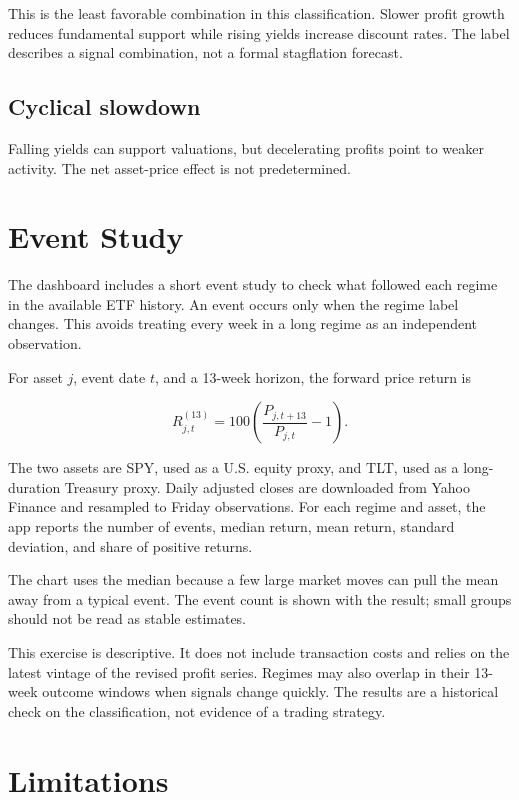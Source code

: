 \documentclass[11pt]{article}
\begin{document}
This is the least favorable combination in this classification. Slower profit growth
reduces fundamental support while rising yields increase discount rates. The
label describes a signal combination, not a formal stagflation forecast.

\subsection{Cyclical slowdown}

Falling yields can support valuations, but decelerating profits point to weaker
activity. The net asset-price effect is not predetermined.

\section{Event Study}

The dashboard includes a short event study to check what followed each regime
in the available ETF history. An event occurs only when the regime label
changes. This avoids treating every week in a long regime as an independent
observation.

For asset $j$, event date $t$, and a 13-week horizon, the forward price return is

\[
R_{j,t}^{(13)} = 100\left(\frac{P_{j,t+13}}{P_{j,t}}-1\right).
\]

The two assets are SPY, used as a U.S. equity proxy, and TLT, used as a
long-duration Treasury proxy. Daily adjusted closes are downloaded from Yahoo
Finance and resampled to Friday observations. For each regime and asset, the app
reports the number of events, median return, mean return, standard deviation,
and share of positive returns.

The chart uses the median because a few large market moves can pull the mean
away from a typical event. The event count is shown with the result; small
groups should not be read as stable estimates.

This exercise is descriptive. It does not include transaction costs and relies
on the latest vintage of the revised profit series. Regimes may also overlap in their 13-week outcome
windows when signals change quickly. The results are a historical check on the
classification, not evidence of a trading strategy.

\section{Limitations}
\end{document}
